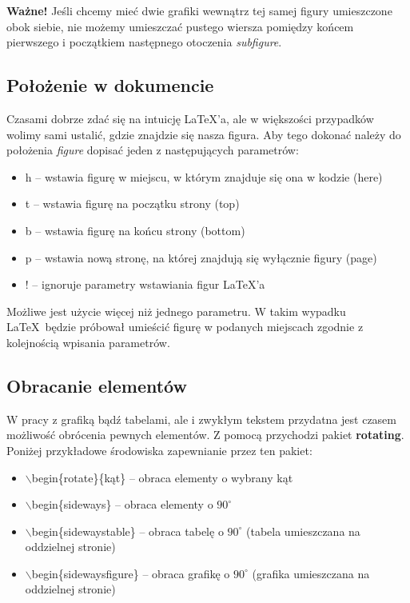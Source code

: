 \documentclass[a4paper, 12pt]{article}
\begin{document}
\textbf{Ważne!} Jeśli chcemy mieć dwie grafiki wewnątrz tej samej figury umieszczone obok siebie, nie możemy umieszczać pustego wiersza pomiędzy końcem pierwszego i początkiem następnego otoczenia \textit{subfigure}.

\subsection{Położenie w dokumencie}
Czasami dobrze zdać się na intuicję \LaTeX 'a, ale w większości przypadków wolimy sami ustalić, gdzie znajdzie się nasza figura. Aby tego dokonać należy do położenia \textit{figure} dopisać jeden z następujących parametrów:
\begin{itemize}
	\item h -- wstawia figurę w miejscu, w którym znajduje się ona w kodzie (here)
	\item t -- wstawia figurę na początku strony (top) 
	\item b -- wstawia figurę na końcu strony (bottom)
	\item p -- wstawia nową stronę, na której znajdują się wyłącznie figury (page)
	\item ! -- ignoruje parametry wstawiania figur \LaTeX 'a
\end{itemize}

Możliwe jest użycie więcej niż jednego parametru. W takim wypadku \LaTeX ~będzie próbował umieścić figurę w podanych miejscach zgodnie z kolejnością wpisania parametrów.

\subsection{Obracanie elementów}
W pracy z grafiką bądź tabelami, ale i zwykłym tekstem przydatna jest czasem możliwość obrócenia pewnych elementów. Z pomocą przychodzi pakiet \textbf{rotating}. Poniżej przykładowe środowiska zapewnianie przez ten pakiet:
\begin{itemize}
	\item $\backslash$begin\{rotate\}\{kąt\} -- obraca elementy o wybrany kąt
	\item $\backslash$begin\{sideways\} -- obraca elementy o $90^{\circ}$
	\item $\backslash$begin\{sidewaystable\} -- obraca tabelę o $90^{\circ}$ (tabela umieszczana na oddzielnej stronie)
	\item $\backslash$begin\{sidewaysfigure\} -- obraca grafikę o $90^{\circ}$ (grafika umieszczana na oddzielnej stronie)
\end{itemize}
\end{document}
